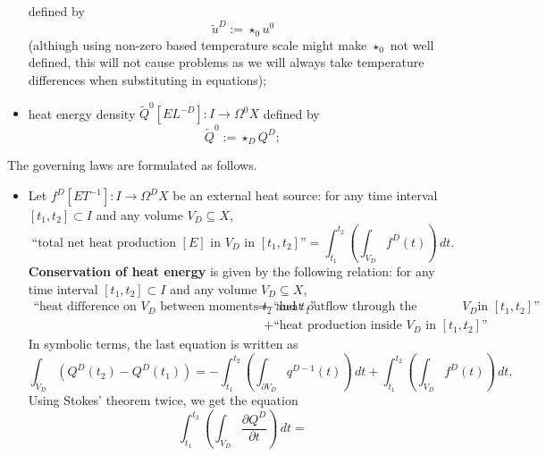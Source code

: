 \begin{discussion}
\begin{itemize}
      defined by
      \begin{equation}
        \tilde{u}^D := \star_0 u^0
      \end{equation}
      (althiugh using non-zero based temperature scale might make $\star_0$ not
      well defined, this will not cause problems as we will always take
      temperature differences when substituting in equations);
    \item
      heat energy density $\tilde{Q}^0 [E L^{-D}] \colon I \to \Omega^0 X$
      defined by
      \begin{equation}
        \tilde{Q}^0 := \star_D Q^D;
      \end{equation}
  \end{itemize}
  The governing laws are formulated as follows.
  \begin{itemize}
    \item
      Let $f^D [E T^{-1}] \colon I \to \Omega^D X$ be an external heat source:
      for any time interval $[t_1, t_2] \subset I$
      and any volume $V_D \subseteq X$,
      \begin{equation}
        \text{``total net heat production $[E]$ in $V_D$ in $[t_1, t_2]$''}
        = \int_{t_1}^{t_2} \left(\int_{V_D} f^D(t) \right)\, d t.
      \end{equation}
      \textbf{Conservation of heat energy} is given by the following relation:
      for any time interval $[t_1, t_2] \subset I$
      and any volume $V_D \subseteq X$,
      \begin{equation}
        \begin{split}
        \text{``heat difference on $V_D$ between moments $t_2$ and $t_1$''} =
        & - \text{``heat outflow through the boundary of $V_D$
          in $[t_1, t_2]$''} \\
        & +
          \text{``heat production inside $V_D$ in $[t_1, t_2]$''}.
        \end{split}
      \end{equation}
      In symbolic terms, the last equation is written as
      \begin{equation}
        \int_{V_D} (Q^D(t_2) - Q^D(t_1))
        = - \int_{t_1}^{t_2}
          \left(\int_{\partial V_D} q^{D - 1}(t) \right)\, d t
        + \int_{t_1}^{t_2} \left(\int_{V_D} f^D(t) \right)\, d t.
      \end{equation}
      Using Stokes' theorem twice, we get the equation
      \begin{equation}
        \int_{t_1}^{t_2}
          \left(\int_{V_D} \frac{\partial Q^D}{\partial t}\right)\, d t =

\end{equation}
\end{itemize}
\end{discussion}
